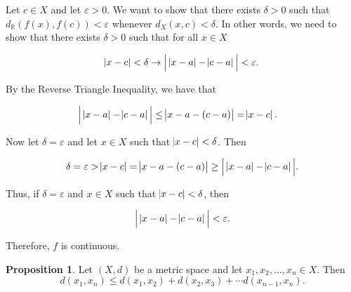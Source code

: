 \documentclass{article}
\makeatletter
\theoremstyle{definition}
\newtheorem{prop}{Proposition}[section]
\theoremstyle{remark}
\let\oldproofname=\proofname
\renewcommand{\proofname}{\bf{\textit{\oldproofname}}}
\theoremstyle{definition}
\renewenvironment{proof}[1][\proofname]{\par
  \pushQED{\qed}%
  \normalfont \topsep6\p@\@plus6\p@\relax
  \list{}{\leftmargin=0mm
          \rightmargin=0mm
          \settowidth{\itemindent}{\itshape#1}%
          \labelwidth=\itemindent
          \parsep=0pt \listparindent=0mm%
  }
  \item[\hskip\labelsep
        \itshape
    #1\@addpunct{.}]\ignorespaces
}{%
  \popQED\endlist\@endpefalse
}
\makeatother
\begin{document}
    \begin{proof}
        Let $c\in X$ and let $\varepsilon>0$. We want to show that there exists $\delta>0$ such that $d_{\mathbb{R}}(f(x),f(c))<\varepsilon$ whenever $d_X(x,c)<\delta$. In other words, we need to show that there exists $\delta >0$ such that for all $x\in X$
        
        \begin{equation*}
            \abs{x-c}<\delta\rightarrow\Bigl|\;\abs{x-a}-\abs{c-a}\,\Bigr|<\varepsilon.
        \end{equation*}
        
        By the Reverse Triangle Inequality, we have that 
        
        \begin{equation*}
            \begin{split}
                \Bigl|\;\abs{x-a}-\abs{c-a}\,\Bigr|&\leq\abs{x-a-(c-a)}=\abs{x-c}.
            \end{split}
        \end{equation*}
        
        Now let $\delta=\varepsilon$ and let $x\in X$ such that $\abs{x-c}<\delta$. Then 
        
        \begin{equation*}
            \delta=\varepsilon>\abs{x-c}=\abs{x-a-(c-a)}\geq\Bigl|\;\abs{x-a}-\abs{c-a}\,\Bigr|.
        \end{equation*}
        
        Thus, if $\delta=\varepsilon$ and $x\in X$ such that $\abs{x-c}<\delta$, then 
        
        \begin{equation*}
            \Bigl|\;\abs{x-a}-\abs{c-a}\,\Bigr|<\varepsilon.
        \end{equation*}
        
        Therefore, $f$ is continuous.
    \end{proof}
    
    \begin{prop}\label{prop:1.3} 
        Let $(X,d)$ be a metric space and let $x_1,x_2,\dots,x_n\in X$. Then  
        \begin{equation*}
            d(x_1,x_n)\leq d(x_1,x_2)+d(x_2,x_3)+\cdots d(x_{n-1},x_n).
        \end{equation*}
    \end{prop}
        
\end{document}
